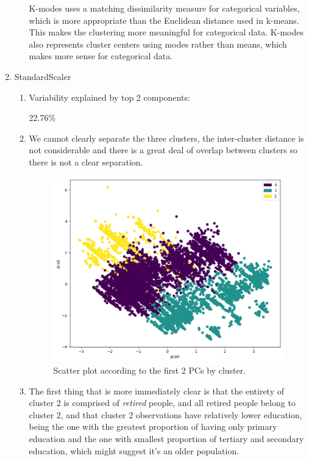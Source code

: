 \documentclass{article}
\begin{document}
\begin{enumerate}[leftmargin=\labelsep]
\begin{enumerate}
K-modes uses a matching dissimilarity measure for categorical variables, which is more appropriate than the Euclidean distance used in k-means. This makes the clustering more meaningful for categorical data.
K-modes also represents cluster centers using modes rather than means, which makes more  sense for categorical data. 
\end{enumerate}

\vfill
\item StandardScaler
\begin{enumerate}
  \item Variability explained by top 2 components:

22.76\%
\vfill
\item We cannot clearly separate the three clusters, the inter-cluster distance is not considerable and there is a great deal of overlap between clusters so there is not a clear separation.
\begin{figure}[H]  %
  \centering
  \includegraphics[width=0.8\linewidth]{img/pca-clusters.png}
  \caption{Scatter plot according to the first 2 PCs by cluster.}
\end{figure}
\newpage
\item The first thing that is more immediately clear is that the entirety of cluster
2 is comprised of \textit{retired} people, and all retired people belong to cluster 2,
and that cluster 2 observations have relatively lower education, being the one
with the greatest proportion of having only primary education and the one with
smallest proportion of tertiary and secondary education, which might suggest it's
an older population.
\begin{figure}[H]  %
  \centering

\end{figure}
\end{enumerate}
\end{enumerate}
\end{document}
